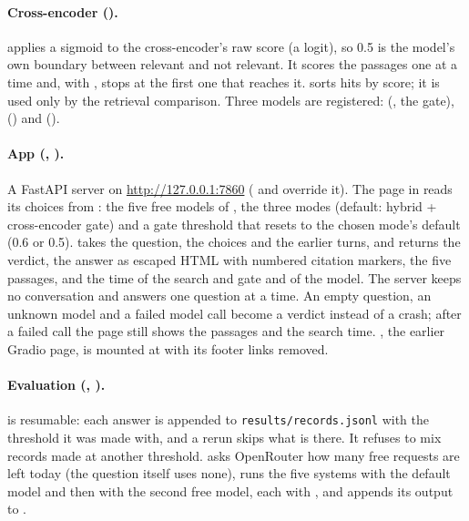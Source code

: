 \paragraph{Cross-encoder ().}
 applies a sigmoid to the cross-encoder's raw score (a logit), so 0.5 is the
model's own boundary between relevant and not relevant. It scores the passages one at a time and,
with , stops at the first one that reaches it.  sorts hits by score; it
is used only by the retrieval comparison. Three models are registered: 
(, the gate), 
() and  ().

\paragraph{App (, ).}
A FastAPI server on \url{http://127.0.0.1:7860} ( and  override it). The page
in  reads its choices from : the five free models of
, the three modes (default: hybrid + cross-encoder gate) and a gate threshold that
resets to the chosen mode's default (0.6 or 0.5).  takes the question, the
choices and the earlier turns, and returns the verdict, the answer as escaped HTML with numbered
citation markers, the five passages, and the time of the search and gate and of the model. The server
keeps no conversation and answers one question at a time. An empty question, an unknown model and a
failed model call become a verdict instead of a crash; after a failed call the page still shows the
passages and the search time. , the earlier Gradio page, is mounted at
 with its footer links removed.

\paragraph{Evaluation (, ).}
 is resumable: each answer is appended to \nolinkurl{results/records.jsonl} with the threshold
it was made with, and a rerun skips what is there. It refuses to mix records made at another
threshold.  asks OpenRouter how many free requests are left today (the
question itself uses none), runs the five systems with the default model and then
 with the second free model, each with , and appends its output to
.
